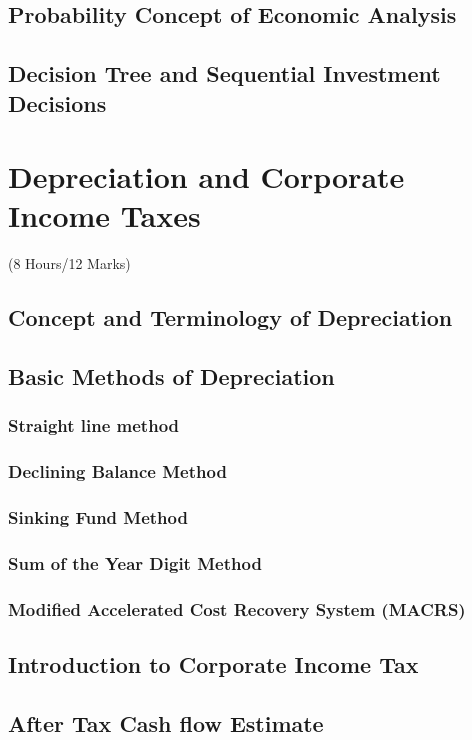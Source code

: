 \documentclass[12pt]{article}
\begin{document}
	\subsection{Probability Concept of Economic Analysis}
	\subsection{Decision Tree and Sequential Investment Decisions}

	\pagebreak
\section{Depreciation and Corporate Income Taxes}	
	\begin{center}(8 Hours/12 Marks)\end{center}
	\subsection{Concept and Terminology of Depreciation}
	\subsection{Basic Methods of Depreciation}
	\subsubsection{Straight line method}
	\subsubsection{Declining Balance Method}
	\subsubsection{Sinking Fund Method}
	\subsubsection{Sum of the Year Digit Method}
	\subsubsection{Modified Accelerated Cost Recovery System (MACRS)}
	\subsection{Introduction to Corporate Income Tax}
	\subsection{After Tax Cash flow Estimate}
\end{document}
